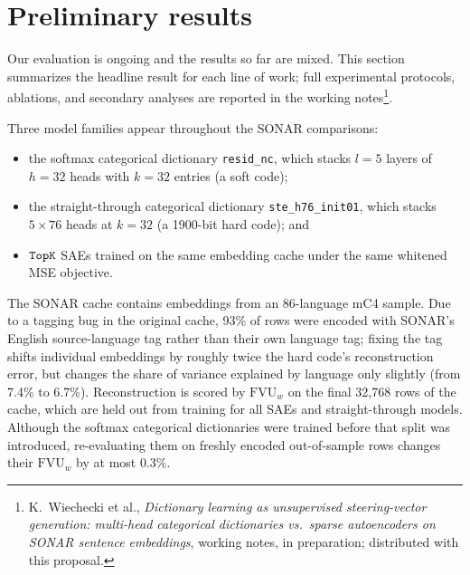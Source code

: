\section{Preliminary results}
\label{sec:prelim}
Our evaluation is ongoing and the results so far are mixed. This section
summarizes the headline result for each line of work; full experimental
protocols, ablations, and secondary analyses are reported in the working
notes\footnote{K.~Wiechecki et al., \emph{Dictionary
learning as unsupervised steering-vector generation: multi-head
categorical dictionaries vs.\ sparse autoencoders on SONAR sentence
embeddings}, working notes, in preparation; distributed with this
proposal.}.

Three model families appear throughout the SONAR comparisons:
\begin{itemize}
	\item the softmax categorical dictionary \texttt{resid\_nc}, which stacks
	$l{=}5$ layers of $h{=}32$ heads with $k{=}32$ entries (a soft code);
	\item the straight-through categorical dictionary \texttt{ste\_h76\_init01},
	which stacks $5\times76$ heads at $k{=}32$ (a 1900-bit hard code); and
	\item $\mathop{\mathtt{TopK}}\limits$ SAEs trained on the same embedding cache under the same
	whitened MSE objective.
\end{itemize}
The SONAR cache contains embeddings from an 86-language mC4 sample. Due
to a tagging bug in the original cache, 93\% of rows were encoded with
SONAR's English source-language tag rather than their own language tag;
fixing the tag shifts individual embeddings by roughly twice the hard
code's reconstruction error, but changes the share of variance explained
by language only slightly (from 7.4\% to 6.7\%). Reconstruction is
scored by $\mathrm{FVU}_w$ on the final 32{,}768 rows of the cache,
which are held out from training for all SAEs and straight-through
models. Although the softmax categorical dictionaries were trained before
that split was introduced, re-evaluating them on freshly encoded
out-of-sample rows changes their $\mathrm{FVU}_w$ by at most 0.3\%.

